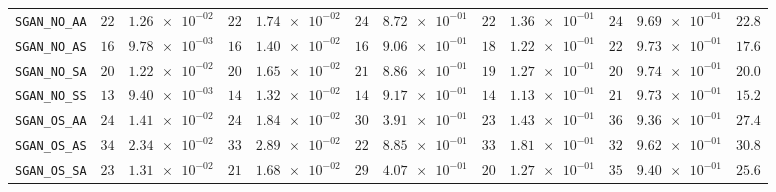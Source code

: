 \begin{xltabular}{\textwidth}{l||cC|cC|cC|cC|cC||c}
	\texttt{SGAN\_NO\_AA} & $ 22$ & $ \num{1.26e-02}$ & $ 22$ & $ \num{1.74e-02}$ & $ 24$ & $ \num{8.72e-01}$ & $ 22$ & $ \num{1.36e-01}$ & $ 24$ & $ \num{9.69e-01}$ & $ 22.8$  \\
	\texttt{SGAN\_NO\_AS} & $ 16$ & $ \num{9.78e-03}$ & $ 16$ & $ \num{1.40e-02}$ & $ 16$ & $ \num{9.06e-01}$ & $ 18$ & $ \num{1.22e-01}$ & $ 22$ & $ \num{9.73e-01}$ & $ 17.6$  \\
	\texttt{SGAN\_NO\_SA} & $ 20$ & $ \num{1.22e-02}$ & $ 20$ & $ \num{1.65e-02}$ & $ 21$ & $ \num{8.86e-01}$ & $ 19$ & $ \num{1.27e-01}$ & $ 20$ & $ \num{9.74e-01}$ & $ 20.0$  \\
	\texttt{SGAN\_NO\_SS} & $ 13$ & $ \num{9.40e-03}$ & $ 14$ & $ \num{1.32e-02}$ & $ 14$ & $ \num{9.17e-01}$ & $ 14$ & $ \num{1.13e-01}$ & $ 21$ & $ \num{9.73e-01}$ & $ 15.2$  \\
	\texttt{SGAN\_OS\_AA} & $ 24$ & $ \num{1.41e-02}$ & $ 24$ & $ \num{1.84e-02}$ & $ 30$ & $ \num{3.91e-01}$ & $ 23$ & $ \num{1.43e-01}$ & $ 36$ & $ \num{9.36e-01}$ & $ 27.4$  \\
	\texttt{SGAN\_OS\_AS} & $ 34$ & $ \num{2.34e-02}$ & $ 33$ & $ \num{2.89e-02}$ & $ 22$ & $ \num{8.85e-01}$ & $ 33$ & $ \num{1.81e-01}$ & $ 32$ & $ \num{9.62e-01}$ & $ 30.8$  \\
	\texttt{SGAN\_OS\_SA} & $ 23$ & $ \num{1.31e-02}$ & $ 21$ & $ \num{1.68e-02}$ & $ 29$ & $ \num{4.07e-01}$ & $ 20$ & $ \num{1.27e-01}$ & $ 35$ & $ \num{9.40e-01}$ & $ 25.6$  \\

\end{xltabular}
